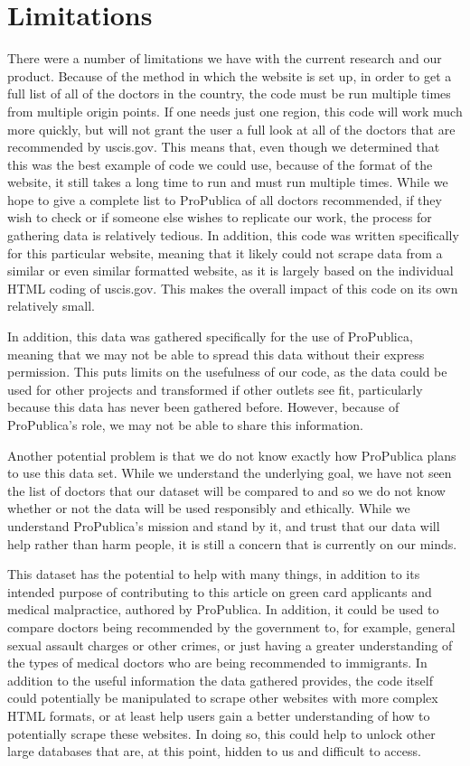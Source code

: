 \documentclass[10pt,letterpaper]{article}
\begin{document}
\section{Limitations}\label{limitations}

There were a number of limitations we have with the current research and
our product. Because of the method in which the website is set up, in
order to get a full list of all of the doctors in the country, the code
must be run multiple times from multiple origin points. If one needs
just one region, this code will work much more quickly, but will not
grant the user a full look at all of the doctors that are recommended by
uscis.gov. This means that, even though we determined that this was the
best example of code we could use, because of the format of the website,
it still takes a long time to run and must run multiple times. While we
hope to give a complete list to ProPublica of all doctors recommended,
if they wish to check or if someone else wishes to replicate our work,
the process for gathering data is relatively tedious. In addition, this
code was written specifically for this particular website, meaning that
it likely could not scrape data from a similar or even similar formatted
website, as it is largely based on the individual HTML coding of
uscis.gov. This makes the overall impact of this code on its own
relatively small.

In addition, this data was gathered specifically for the use of
ProPublica, meaning that we may not be able to spread this data without
their express permission. This puts limits on the usefulness of our
code, as the data could be used for other projects and transformed if
other outlets see fit, particularly because this data has never been
gathered before. However, because of ProPublica's role, we may not be
able to share this information.

Another potential problem is that we do not know exactly how ProPublica
plans to use this data set. While we understand the underlying goal, we
have not seen the list of doctors that our dataset will be compared to
and so we do not know whether or not the data will be used responsibly
and ethically. While we understand ProPublica's mission and stand by it,
and trust that our data will help rather than harm people, it is still a
concern that is currently on our minds.

This dataset has the potential to help with many things, in addition to
its intended purpose of contributing to this article on green card
applicants and medical malpractice, authored by ProPublica. In addition,
it could be used to compare doctors being recommended by the government
to, for example, general sexual assault charges or other crimes, or just
having a greater understanding of the types of medical doctors who are
being recommended to immigrants. In addition to the useful information
the data gathered provides, the code itself could potentially be
manipulated to scrape other websites with more complex HTML formats, or
at least help users gain a better understanding of how to potentially
scrape these websites. In doing so, this could help to unlock other
large databases that are, at this point, hidden to us and difficult to
access.
\end{document}
